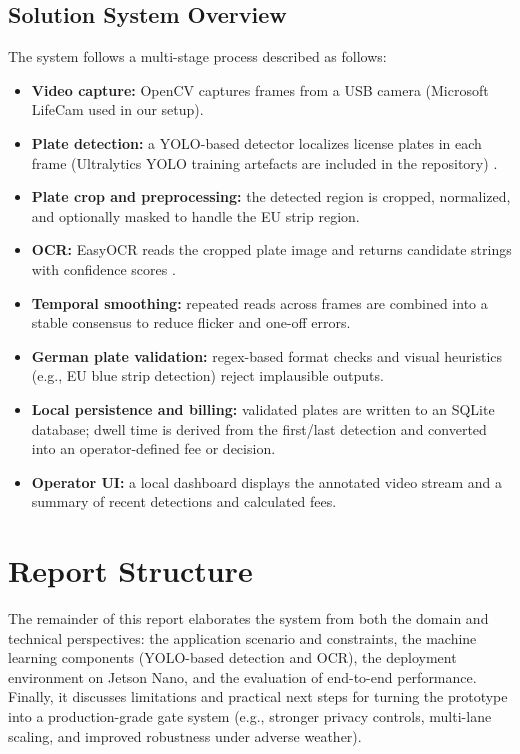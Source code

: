 \subsection{Solution System Overview}
The system follows a multi-stage process described as follows:
\begin{itemize}
	\item \textbf{Video capture:} OpenCV captures frames from a USB camera (Microsoft LifeCam used in our setup).
	\item \textbf{Plate detection:} a YOLO-based detector localizes license plates in each frame (Ultralytics YOLO training artefacts are included in the repository) \cite{Ultralytics2023}.
	\item \textbf{Plate crop and preprocessing:} the detected region is cropped, normalized, and optionally masked to handle the EU strip region.
	\item \textbf{\ac{OCR}:} EasyOCR reads the cropped plate image and returns candidate strings with confidence scores \cite{easyocr-2020}.
	\item \textbf{Temporal smoothing:} repeated reads across frames are combined into a stable consensus to reduce flicker and one-off errors.
	\item \textbf{German plate validation:} regex-based format checks and visual heuristics (e.g., EU blue strip detection) reject implausible outputs.
	\item \textbf{Local persistence and billing:} validated plates are written to an SQLite database; dwell time is derived from the first/last detection and converted into an operator-defined fee or decision.
	\item \textbf{Operator UI:} a local dashboard displays the annotated video stream and a summary of recent detections and calculated fees.
\end{itemize}

\section{Report Structure}
The remainder of this report elaborates the system from both the domain and technical perspectives: the application scenario and constraints, the machine learning components (YOLO-based detection and \ac{OCR}), the deployment environment on Jetson Nano, and the evaluation of end-to-end performance. Finally, it discusses limitations and practical next steps for turning the prototype into a production-grade gate system (e.g., stronger privacy controls, multi-lane scaling, and improved robustness under adverse weather).

